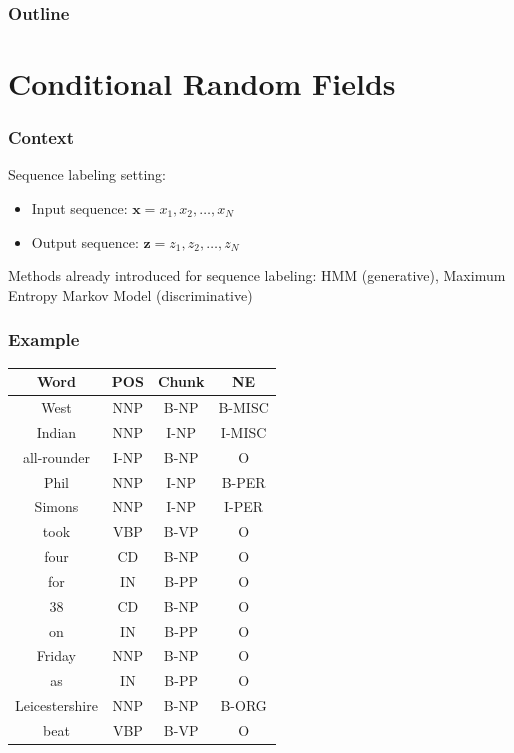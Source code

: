 \documentclass[usenames,dvipsnames]{beamer}
\author[Chrupala and Stroppa]{Grzegorz Chrupa{\l}a and Nicolas Stroppa}
\institute[]  %
{
Saarland University\\
Google
}
\date[2010] %
{META Workshop}
\newcommand{\x}{\mathbf{x}}
\newcommand{\z}{\mathbf{z}}
\begin{document}
\frame{\titlepage}

\begin{frame}
  \frametitle{Outline}
  \tableofcontents
\end{frame}

\section{Conditional Random Fields}
\begin{frame}\frametitle{Context}

Sequence labeling setting:
\begin{itemize}
\item Input sequence: $\x = x_1, x_2, \dots, x_N$
\item Output sequence: $\z = z_1, z_2, \dots, z_N$
\end{itemize}

\vspace{0.4cm}
Methods already introduced for sequence labeling: HMM (generative), Maximum Entropy Markov
Model (discriminative)

\end{frame}

\begin{frame}\frametitle{Example}

\begin{center}
\begin{tabular}{ccc|c}
\hline
Word & POS & Chunk & NE \\
\hline
West & NNP & B-NP & B-MISC \\
Indian & NNP & I-NP & I-MISC \\
all-rounder & I-NP & B-NP & O \\
Phil & NNP & I-NP & B-PER \\
Simons & NNP & I-NP & I-PER \\
took & VBP & B-VP & O \\
four & CD & B-NP & O \\
for & IN & B-PP & O \\
38 & CD & B-NP & O \\
on & IN & B-PP & O \\
Friday & NNP & B-NP & O \\
as & IN & B-PP & O \\
Leicestershire & NNP & B-NP & B-ORG \\
beat & VBP & B-VP & O \\
\end{tabular}
\end{center}

\end{frame}
\end{document}
